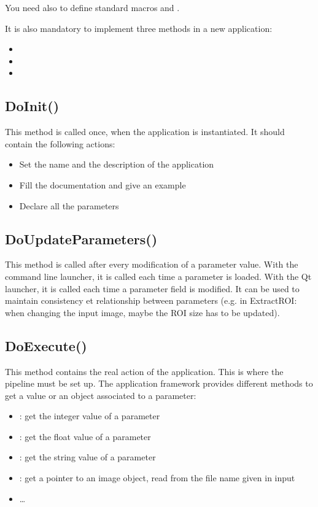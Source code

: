 You need also to define standard macros  and
.
 
It is also mandatory to implement three methods in a new application:
\begin{itemize}
  \item {}
  \item {}
  \item {}
\end{itemize}

\subsection{DoInit()}
\label{sec:appDoInit}
This method is called once, when the application is instantiated. It should 
contain the following actions:
\begin{itemize}
  \item Set the name and the description of the application
  \item Fill the documentation and give an example
  \item Declare all the parameters
\end{itemize}


\subsection{DoUpdateParameters()}
\label{sec:appDoUpdateParameters}
This method is called after every modification of a parameter value. With the command 
line launcher, it is called each time a parameter is loaded. With the Qt launcher, it
is called each time a parameter field is modified. It can be used to maintain consistency et relationship
between parameters (e.g. in ExtractROI: when changing the input image, maybe the ROI size 
has to be updated).

\subsection{DoExecute()}
\label{sec:appDoExecute}
This method contains the real action of the application. This is where the pipeline 
must be set up. The application framework provides different methods to get a value 
or an object associated to a parameter:
\begin{itemize}
  \item {} : get the integer value of a parameter
  \item {} : get the float value of a parameter
  \item {} : get the string value of a parameter
  \item {} : get a pointer to an image object, read from the
  file name given in input
  \item \dots
\end{itemize}

